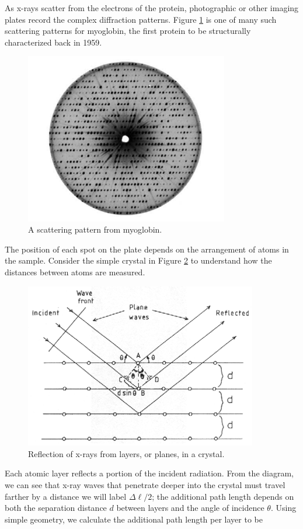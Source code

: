 As x-rays scatter from the electrons of the protein, photographic or other imaging plates record the complex diffraction patterns. Figure \ref{Fig9-4} is one of many such scattering patterns for myoglobin, the first protein to be structurally characterized back in 1959.
\begin{figure}[h]
	\centering
	\includegraphics[width=3.5in]{./figures/Topic9/Fig9-4.jpg}
	\caption{A scattering pattern from myoglobin.}
 	\label{Fig9-4}
\end{figure}
The position of each spot on the plate depends on the arrangement of atoms in the sample.  Consider the simple crystal in Figure \ref{Fig9-5} to understand how the distances between atoms are measured.
 \begin{figure}[h]
	\centering
	\includegraphics[width=4.0in]{./figures/Topic9/Fig9-5.png}
	\caption{ Reflection of x-rays from layers, or planes, in a crystal.}
 	\label{Fig9-5}
\end{figure}
Each atomic layer reflects a portion of the incident radiation.  From the diagram, we can see that x-ray waves that penetrate deeper into the crystal must travel farther by a distance we will label $\Delta\ell/2$; the additional path length depends on both the separation distance $d$ between layers and the angle of incidence $\theta$.  Using simple geometry, we calculate the additional path length per layer to be 
